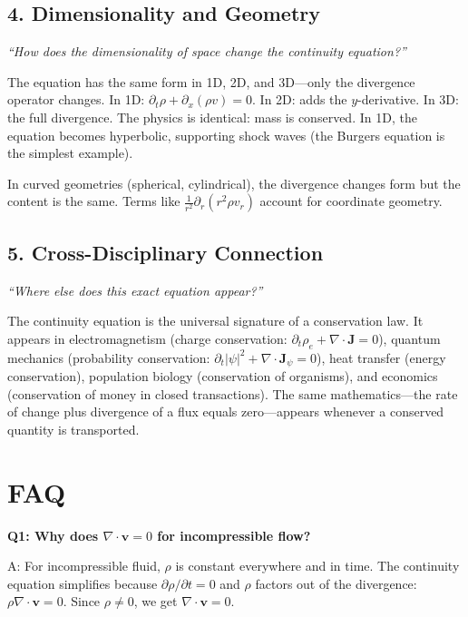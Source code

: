 \documentclass[11pt,openright]{book}
\begin{document}
\subsection*{4. Dimensionality and Geometry}
\textit{``How does the dimensionality of space change the continuity equation?''}

The equation has the same form in 1D, 2D, and 3D---only the divergence operator changes. In 1D: $\partial_t \rho + \partial_x (\rho v) = 0$. In 2D: adds the $y$-derivative. In 3D: the full divergence. The physics is identical: mass is conserved. In 1D, the equation becomes hyperbolic, supporting shock waves (the Burgers equation is the simplest example).

In curved geometries (spherical, cylindrical), the divergence changes form but the content is the same. Terms like $\frac{1}{r^2}\partial_r(r^2 \rho v_r)$ account for coordinate geometry.

\subsection*{5. Cross-Disciplinary Connection}
\textit{``Where else does this exact equation appear?''}

The continuity equation is the universal signature of a conservation law. It appears in electromagnetism (charge conservation: $\partial_t \rho_e + \nabla \cdot \mathbf{J} = 0$), quantum mechanics (probability conservation: $\partial_t |\psi|^2 + \nabla \cdot \mathbf{J}_\psi = 0$), heat transfer (energy conservation), population biology (conservation of organisms), and economics (conservation of money in closed transactions). The same mathematics---the rate of change plus divergence of a flux equals zero---appears whenever a conserved quantity is transported.


\section*{FAQ}

\textbf{Q1: Why does $\nabla \cdot \mathbf{v} = 0$ for incompressible flow?}

A: For incompressible fluid, $\rho$ is constant everywhere and in time. The continuity equation simplifies because $\partial\rho/\partial t = 0$ and $\rho$ factors out of the divergence: $\rho \nabla \cdot \mathbf{v} = 0$. Since $\rho \neq 0$, we get $\nabla \cdot \mathbf{v} = 0$.
\end{document}
